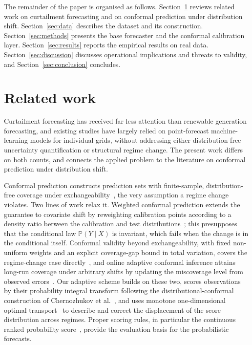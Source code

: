 \documentclass[preprint,3p,times]{elsarticle}
\begin{document}
The remainder of the paper is organised as follows. Section~\ref{sec:related} reviews related work on curtailment forecasting and on conformal prediction under distribution shift. Section~\ref{sec:data} describes the dataset and its construction. Section~\ref{sec:methods} presents the base forecaster and the conformal calibration layer. Section~\ref{sec:results} reports the empirical results on real data. Section~\ref{sec:discussion} discusses operational implications and threats to validity, and Section~\ref{sec:conclusion} concludes.

\section{Related work}
\label{sec:related}

Curtailment forecasting has received far less attention than renewable generation forecasting, and existing studies have largely relied on point-forecast machine-learning models for individual grids, without addressing either distribution-free uncertainty quantification or structural regime change. The present work differs on both counts, and connects the applied problem to the literature on conformal prediction under distribution shift.

Conformal prediction constructs prediction sets with finite-sample, distribution-free coverage under exchangeability~\cite{angelopoulos2023}, the very assumption a regime change violates. Two lines of work relax it. Weighted conformal prediction extends the guarantee to covariate shift by reweighting calibration points according to a density ratio between the calibration and test distributions~\cite{tibshirani2019}; this presupposes that the conditional law $\mathbb{P}(Y\mid X)$ is invariant, which fails when the change is in the conditional itself. Conformal validity beyond exchangeability, with fixed non-uniform weights and an explicit coverage-gap bound in total variation, covers the regime-change case directly~\cite{barber2023}, and online adaptive conformal inference attains long-run coverage under arbitrary shifts by updating the miscoverage level from observed errors~\cite{gibbs2021}. Our adaptive scheme builds on these two, scores observations by their probability integral transform following the distributional-conformal construction of Chernozhukov et al.~\cite{chernozhukov2021}, and uses monotone one-dimensional optimal transport~\cite{peyre2019} to describe and correct the displacement of the score distribution across regimes. Proper scoring rules, in particular the continuous ranked probability score~\cite{gneiting2007}, provide the evaluation basis for the probabilistic forecasts.
\end{document}
